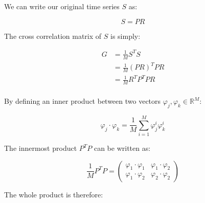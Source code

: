\documentclass{article}[a4]
\begin{document}
We can write our original time series \(S\) as:

\[S = PR\]

The cross correlation matrix of \(S\) is simply:

\begin{align*}
G &= \frac{1}{M} S^T S \\
  &= \frac{1}{M} \left( PR \right)^T PR \\
  &= \frac{1}{M} R^T P^T PR \\
\end{align*}

By defining an inner product between two vectors \(\varphi_j, \varphi_k \in \mathbb{R}^M\):

\[\varphi_j \cdot \varphi_k = \frac{1}{M} \sum_{i=1}^{M} \varphi_j^i \varphi_k^i\]

The innermost product \(P^T P\) can be written as:

\begin{equation*}
\frac{1}{M} P^T P =
\begin{pmatrix}
\varphi_1 \cdot \varphi_1 & \varphi_1 \cdot \varphi_2 \\
\varphi_1 \cdot \varphi_2 & \varphi_2 \cdot \varphi_2
\end{pmatrix}
\end{equation*}

The whole product is therefore:
\end{document}
